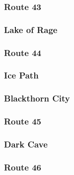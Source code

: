 \documentclass[11pt]{article}
\begin{document}
\subsubsection{Route 43}%
\label{ssubsec:Route43}%

%
%
\subsubsection{Lake of Rage}%
\label{ssubsec:LakeofRage}%

%
%
%
%
\subsubsection{Route 44}%
\label{ssubsec:Route44}%

%
%
%
%
%
\subsubsection{Ice Path}%
\label{ssubsec:IcePath}%

%
%
\subsubsection{Blackthorn City}%
\label{ssubsec:BlackthornCity}%

%
%
%
\subsubsection{Route 45}%
\label{ssubsec:Route45}%

%
%
%
%
\subsubsection{Dark Cave}%
\label{ssubsec:DarkCave}%

%
\subsubsection{Route 46}%
\label{ssubsec:Route46}%
\end{document}
